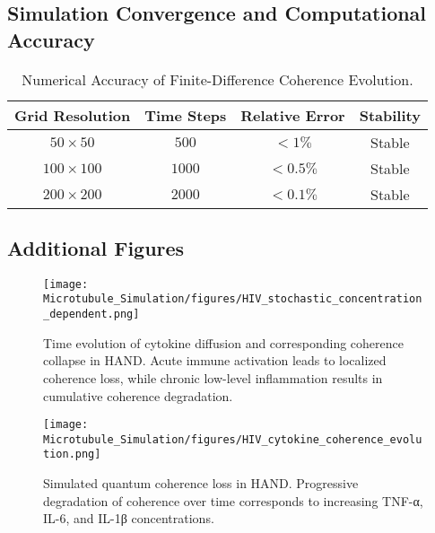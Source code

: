 \documentclass[12pt]{article}
\begin{document}
\subsection*{Simulation Convergence and Computational Accuracy}
\begin{table}[H]
\centering
\caption{Numerical Accuracy of Finite-Difference Coherence Evolution.}
\label{tab:numerical_accuracy}
\begin{tabular}{|c|c|c|c|}
\hline
\textbf{Grid Resolution} & \textbf{Time Steps} & \textbf{Relative Error} & \textbf{Stability} \\
\hline
\( 50 \times 50 \) & \( 500 \) & \( < 1\% \) & Stable \\
\hline
\( 100 \times 100 \) & \( 1000 \) & \( < 0.5\% \) & Stable \\
\hline
\( 200 \times 200 \) & \( 2000 \) & \( < 0.1\% \) & Stable \\
\hline
\end{tabular}
\end{table}

\subsection*{Additional Figures}
\begin{figure}[H]
\centering
\texttt{[image: Microtubule\_Simulation/figures/HIV\_stochastic\_concentration\_dependent.png]}
\caption{Time evolution of cytokine diffusion and corresponding coherence collapse in HAND. Acute immune activation leads to localized coherence loss, while chronic low-level inflammation results in cumulative coherence degradation.}
\label{fig:HIV_coherence_collapse}
\end{figure}

\begin{figure}[H]
\centering
\texttt{[image: Microtubule\_Simulation/figures/HIV\_cytokine\_coherence\_evolution.png]}
\caption{Simulated quantum coherence loss in HAND. Progressive degradation of coherence over time corresponds to increasing TNF-α, IL-6, and IL-1β concentrations.}
\label{fig:HIV_wavefunction_evolution}
\end{figure}
\end{document}
